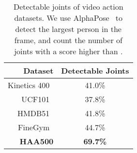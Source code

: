 \documentclass[10pt,twocolumn,letterpaper]{article}
\begin{document}
\begin{table}
\begin{center}
{\small 
\begin{tabular}{r|c}
\hline 
Dataset                         & Detectable Joints            \\ \hline
Kinetics 400~\cite{kinetics400} &         41.0\%               \\ \hline
UCF101~\cite{ucf101}            &         37.8\%               \\ \hline
HMDB51~\cite{HMDB51}            &         41.8\%               \\ \hline
FineGym~\cite{finegym}          &         44.7\%               \\ \hline
\textbf{HAA500}                 & \textbf{69.7\%}              \\ \hline
\end{tabular}
}
\end{center}
\caption{Detectable joints of video action datasets. We use AlphaPose~\cite{alphapose} to detect the largest person in the frame, and count the number of joints with a score higher than . }
\label{table:comparison_joint}
\vspace{-1.5em}
\end{table}
\end{document}

